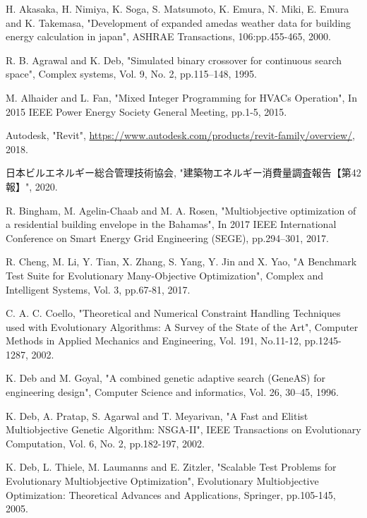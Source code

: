 \begin{thebibliography}{99}

     H. Akasaka, H. Nimiya, K. Soga, S. Matsumoto, K. Emura, N. Miki, E. Emura and K. Takemasa, "Development of expanded amedas weather data for building energy calculation in japan", ASHRAE Transactions, 106:pp.455-465, 2000.

     R. B. Agrawal and K. Deb, "Simulated binary crossover for continuous search space", Complex systems, Vol. 9, No. 2, pp.115–148, 1995.

     M. Alhaider and L. Fan, "Mixed Integer Programming for HVACs Operation", In 2015 IEEE Power Energy Society General Meeting, pp.1-5, 2015.

     Autodesk, "Revit",  \newblock \url{https://www.autodesk.com/products/revit-family/overview/}, 2018.

     日本ビルエネルギー総合管理技術協会, "建築物エネルギー消費量調査報告【第42報】", 2020.

     R. Bingham, M. Agelin-Chaab and M. A. Rosen, "Multiobjective optimization of a residential building envelope in the Bahamas", In 2017 IEEE International Conference on Smart Energy Grid Engineering (SEGE), pp.294–301, 2017.

     R. Cheng, M. Li, Y. Tian, X. Zhang, S. Yang, Y. Jin and X. Yao, "A Benchmark Test Suite for Evolutionary Many-Objective Optimization", Complex and Intelligent Systems, Vol. 3, pp.67-81, 2017.

     C. A. C. Coello, "Theoretical and Numerical Constraint Handling Techniques used with Evolutionary Algorithms: A Survey of the State of the Art", Computer Methods in Applied Mechanics and Engineering, Vol. 191, No.11-12, pp.1245-1287, 2002.

     K. Deb and M. Goyal, "A combined genetic adaptive search (GeneAS) for engineering design", Computer Science and informatics, Vol. 26, 30–45, 1996.

     K. Deb, A. Pratap, S. Agarwal and T. Meyarivan, "A Fast and Elitist Multiobjective Genetic Algorithm: NSGA-II", IEEE Transactions on Evolutionary Computation, Vol. 6, No. 2, pp.182-197, 2002.

     K. Deb, L. Thiele, M. Laumanns and E. Zitzler, "Scalable Test Problems for Evolutionary Multiobjective Optimization", Evolutionary Multiobjective Optimization: Theoretical Advances and Applications, Springer, pp.105-145, 2005.


\end{thebibliography}
